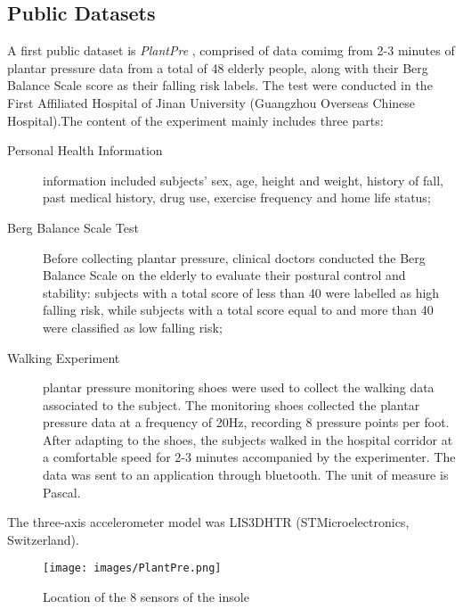 \subsection{Public Datasets}
A first public dataset is \textit{PlantPre} \cite{PlantPre}, comprised of data comimg from 2-3 minutes of plantar pressure data from a total of 48 elderly people, along with their Berg Balance Scale score as their falling risk labels. The test were conducted in the First Affiliated Hospital of Jinan University (Guangzhou Overseas Chinese Hospital).The content of the experiment mainly includes three parts: 
\begin{description}
    \item[Personal Health Information] information included subjects’ sex, age, height and weight, history of fall, past medical history, drug use, exercise frequency and home life status;
    \item[Berg Balance Scale Test] Before collecting plantar pressure, clinical doctors conducted the Berg Balance Scale on the elderly to evaluate their postural control and stability: subjects with a total score of less than 40 were labelled as high falling risk, while subjects with a total score equal to and more than 40 were classified as low falling risk;
    \item[Walking Experiment] plantar pressure monitoring shoes were used to collect the walking data associated to the subject. The monitoring shoes collected the plantar pressure data at a frequency of 20Hz, recording 8 pressure points per foot. After adapting to the shoes, the subjects walked in the hospital corridor at a comfortable speed for 2-3 minutes accompanied by the experimenter. The data was sent to an application through bluetooth. The unit of measure is Pascal.
\end{description}
The three-axis accelerometer model was LIS3DHTR (STMicroelectronics, Switzerland).

\begin{figure}[h!]
    \centering
    \texttt{[image: images/PlantPre.png]}
    \caption{Location of the 8 sensors of the insole}
    \label{fig:PlantPre}
\end{figure}
\FloatBarrier

